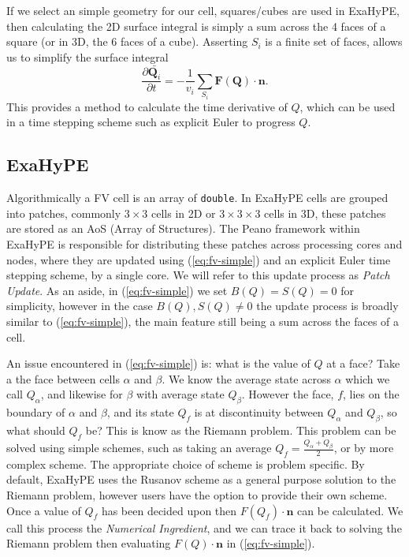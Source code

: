 If we select an simple geometry for our cell, squares/cubes are used in ExaHyPE, then calculating the 2D surface integral is simply a sum across the 4 faces of a square (or in 3D, the 6 faces of a cube).
Asserting $S_i$ is a finite set of faces, allows us to simplify the surface integral
\begin{equation}\label{eq:fv-simple}
   \frac{\partial \bar{\mathbf{Q}_i}}{\partial t} = -\frac{1}{v_i} \sum_{S_i}\mathbf{F}(\mathbf{Q})\cdot \mathbf{n}.
\end{equation}
This provides a method to calculate the time derivative of $Q$, which can be used in a time stepping scheme such as explicit Euler to progress $Q$.


\subsection{ExaHyPE}
\newcommand{\proc}[1]{\textit{#1}}
Algorithmically a FV cell is an array of \lstinline{double}.
In ExaHyPE cells are grouped into patches, commonly $3\times 3$ cells in 2D or $3\times 3 \times 3$ cells in 3D, these patches are stored as an AoS (Array of Structures).
The Peano framework within ExaHyPE is responsible for distributing these patches across processing cores and nodes, where they are updated using (\ref{eq:fv-simple}) and an explicit Euler time stepping scheme, by a single core.
We will refer to this update process as \proc{Patch Update}.
As an aside, in (\ref{eq:fv-simple}) we set $B(Q)=S(Q)=0$ for simplicity, however in the case $B(Q), S(Q)\neq 0$ the update process is broadly similar to (\ref{eq:fv-simple}), the main feature still being a sum across the faces of a cell.

An issue encountered in (\ref{eq:fv-simple}) is: what is the value of $Q$ at a face?
Take a the face between cells $\alpha$ and $\beta$.
We know the average state across $\alpha$ which we call $Q_\alpha$, and likewise for $\beta$ with average state $Q_\beta$.
However the face, $f$, lies on the boundary of $\alpha$ and $\beta$, and its state $Q_f$ is at discontinuity between $Q_\alpha$ and $Q_\beta$, so what should $Q_f$ be?
This is know as the Riemann problem.
This problem can be solved using simple schemes, such as taking an average $Q_f = \frac{Q_\alpha + Q_\beta}{2}$, or by more complex scheme.
The appropriate choice of scheme is problem specific.
By default, ExaHyPE uses the Rusanov scheme \cite{rusanov} as a general purpose solution to the Riemann problem, however users have the option to provide their own scheme.
Once a value of $Q_f$ has been decided upon then $F(Q_f)\cdot \mathbf{n}$ can be calculated.
We call this process the \proc{Numerical Ingredient}, and we can trace it back to solving the Riemann problem then evaluating $F(Q)\cdot\mathbf{n}$ in (\ref{eq:fv-simple}).

